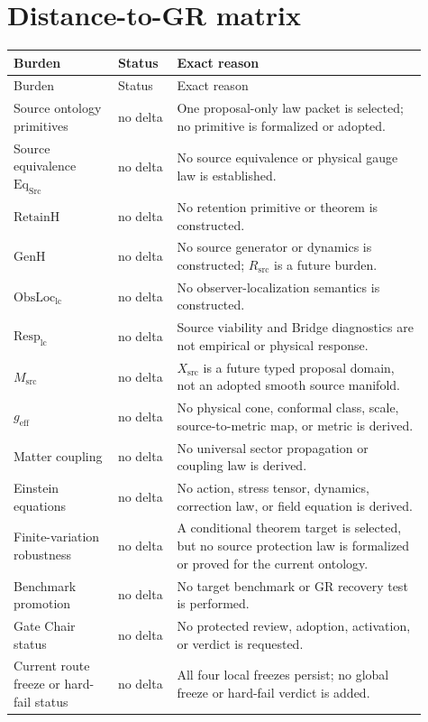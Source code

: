\documentclass[11pt]{article}
\newcommand{\Xsrc}{X_{\mathrm{src}}}
\newcommand{\Rsrc}{R_{\mathrm{src}}}
\begin{document}
\section{Distance-to-GR matrix}

\small
\begin{longtable}{P{0.23\linewidth}P{0.13\linewidth}P{0.55\linewidth}}
\toprule
Burden & Status & Exact reason \\
\midrule
\endfirsthead
\toprule
Burden & Status & Exact reason \\
\midrule
\endhead
Source ontology primitives & no delta & One proposal-only law packet is selected; no primitive is formalized or adopted.\\
Source equivalence $\mathrm{Eq}_{\mathrm{Src}}$ & no delta & No source equivalence or physical gauge law is established.\\
$\mathrm{RetainH}$ & no delta & No retention primitive or theorem is constructed.\\
$\mathrm{GenH}$ & no delta & No source generator or dynamics is constructed; $\Rsrc$ is a future burden.\\
$\mathrm{ObsLoc}_{\mathrm{lc}}$ & no delta & No observer-localization semantics is constructed.\\
$\mathrm{Resp}_{\mathrm{lc}}$ & no delta & Source viability and Bridge diagnostics are not empirical or physical response.\\
$M_{\mathrm{src}}$ & no delta & $\Xsrc$ is a future typed proposal domain, not an adopted smooth source manifold.\\
$g_{\mathrm{eff}}$ & no delta & No physical cone, conformal class, scale, source-to-metric map, or metric is derived.\\
Matter coupling & no delta & No universal sector propagation or coupling law is derived.\\
Einstein equations & no delta & No action, stress tensor, dynamics, correction law, or field equation is derived.\\
Finite-variation robustness & no delta & A conditional theorem target is selected, but no source protection law is formalized or proved for the current ontology.\\
Benchmark promotion & no delta & No target benchmark or GR recovery test is performed.\\
Gate Chair status & no delta & No protected review, adoption, activation, or verdict is requested.\\
Current route freeze or hard-fail status & no delta & All four local freezes persist; no global freeze or hard-fail verdict is added.\\
\bottomrule
\end{longtable}
\normalsize
\end{document}
